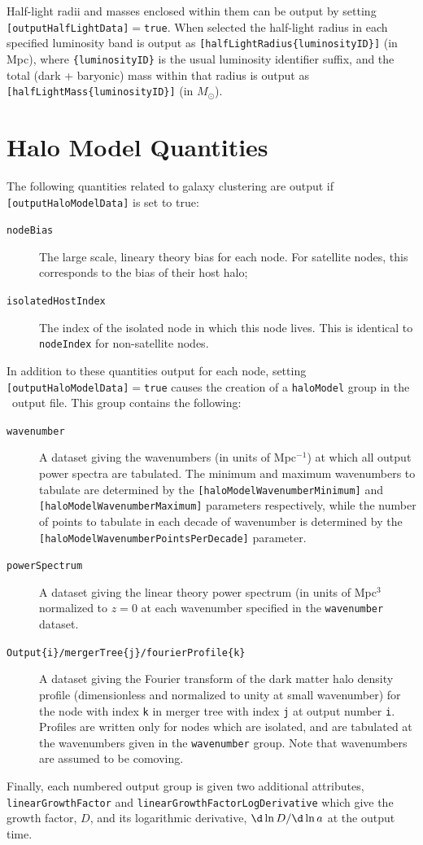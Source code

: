 Half-light radii and masses enclosed within them can be output by setting {\tt [outputHalfLightData]}$=${\tt true}. When selected the half-light radius in each specified luminosity band is output as {\tt [halfLightRadius\{luminosityID\}]} (in Mpc), where {\tt\{luminosityID\}} is the usual luminosity identifier suffix, and the total (dark + baryonic) mass within that radius is output as {\tt [halfLightMass\{luminosityID\}]} (in $M_\odot$).

\section{Halo Model Quantities}\label{sec:HaloModelOutput}

The following quantities related to galaxy clustering are output if {\tt [outputHaloModelData]} is set to true:
\begin{description}
 \item [{\tt nodeBias}] The large scale, lineary theory bias for each node. For satellite nodes, this corresponds to the bias of their host halo;
 \item [{\tt isolatedHostIndex}] The index of the isolated node in which this node lives. This is identical to {\tt nodeIndex} for non-satellite nodes.
\end{description}
In addition to these quantities output for each node, setting {\tt [outputHaloModelData]}$=${\tt true} causes the creation of a {\tt haloModel} group in the \glc\ output file. This group contains the following:
\begin{description}
 \item [{\tt wavenumber}] A dataset giving the wavenumbers (in units of Mpc$^{-1}$) at which all output power spectra are tabulated. The minimum and maximum wavenumbers to tabulate are determined by the {\tt [haloModelWavenumberMinimum]} and {\tt [haloModelWavenumberMaximum]} parameters respectively, while the number of points to tabulate in each decade of wavenumber is determined by the {\tt [haloModelWavenumberPointsPerDecade]} parameter.
 \item [{\tt powerSpectrum}] A dataset giving the linear theory power spectrum (in units of Mpc$^3$ normalized to $z=0$ at each wavenumber specified in the {\tt wavenumber} dataset.
 \item [{\tt Output\{i\}/mergerTree\{j\}/fourierProfile\{k\}}] A dataset giving the Fourier transform of the dark matter halo density profile (dimensionless and normalized to unity at small wavenumber) for the node with index {\tt k} in merger tree with index {\tt j} at output number {\tt i}. Profiles are written only for nodes which are isolated, and are tabulated at the wavenumbers given in the {\tt wavenumber} group. Note that wavenumbers are assumed to be comoving.
\end{description}
Finally, each numbered output group is given two additional attributes, {\tt linearGrowthFactor} and {\tt linearGrowthFactorLogDerivative} which give the growth factor, $D$, and its logarithmic derivative, $\d \ln D / \d \ln a$ at the output time.

